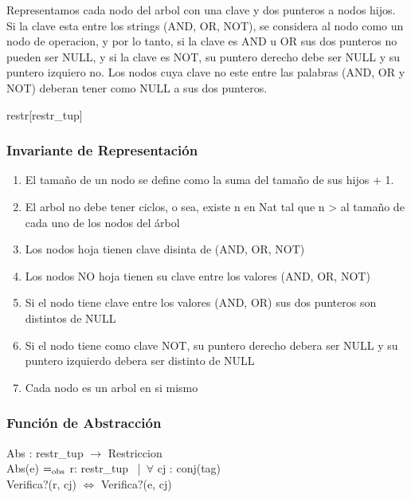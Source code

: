 Representamos cada nodo del arbol con una clave y dos punteros a nodos hijos. Si la clave esta entre los strings (AND, OR, NOT), se considera al nodo como un nodo de operacion, y por lo tanto, si la clave es AND u OR sus dos punteros no pueden ser NULL, y si la clave es NOT, su puntero derecho debe ser NULL y su puntero izquiero no. Los nodos cuya clave no este entre las palabras (AND, OR y NOT) deberan tener como NULL a sus dos punteros.

\begin{Estructura}{restr}[restr\_tup]
    \begin{Tupla}
    \end{Tupla}
    \end{Estructura} 
    
\subsubsection{Invariante de Representaci\'on}

\renewcommand{\labelenumi}{(\Roman{enumi})}
\begin{enumerate}
\item El tama\~no de un nodo se define como la suma del tama\~no de sus hijos + 1.
\item El arbol no debe tener ciclos, o sea, existe n en Nat tal que n > al tama\~no de cada uno de los nodos del \'arbol
\item Los nodos hoja tienen clave disinta de (AND, OR, NOT)
\item Los nodos NO hoja tienen su clave entre los valores (AND, OR, NOT)
\item Si el nodo tiene clave entre los valores (AND, OR) sus dos punteros son distintos de NULL
\item Si el nodo tiene como clave NOT, su puntero derecho debera ser NULL y su puntero izquierdo debera ser distinto de NULL
\item Cada nodo es un arbol en si mismo
\end{enumerate} 
    
\subsubsection{Funci\'on de Abstracci\'on}
Abs : restr\_tup  $\rightarrow$ Restriccion \\

Abs(e) $=_{\mathrm{obs}}$ r: restr\_tup \  |\  $\forall$ cj : conj(tag) \\
\phantom{pala}Verifica?(r, cj) $\Leftrightarrow$ Verifica$?$(e, cj)


